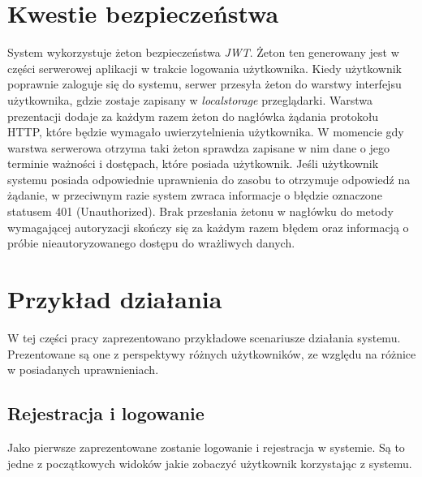 \documentclass[a4paper,twoside,12pt]{book}
\begin{document}
\section {Kwestie bezpieczeństwa}

System wykorzystuje żeton bezpieczeństwa \textit{JWT}. Żeton ten generowany jest w części serwerowej aplikacji w trakcie logowania użytkownika. Kiedy użytkownik poprawnie zaloguje się do systemu, serwer przesyła żeton do warstwy interfejsu użytkownika, gdzie zostaje zapisany w \textit{localstorage} przeglądarki. Warstwa prezentacji dodaje za każdym razem żeton do nagłówka żądania protokołu HTTP, które będzie wymagało uwierzytelnienia użytkownika. W momencie gdy warstwa serwerowa otrzyma taki żeton sprawdza zapisane w nim dane o jego terminie ważności i dostępach, które posiada użytkownik. Jeśli użytkownik systemu posiada odpowiednie uprawnienia do zasobu to otrzymuje odpowiedź na żądanie, w przeciwnym razie system zwraca informacje o błędzie oznaczone statusem 401 (Unauthorized). Brak przesłania żetonu w nagłówku do metody wymagającej autoryzacji skończy się za każdym razem błędem oraz informacją o próbie nieautoryzowanego dostępu do wrażliwych danych.

\section {Przykład działania}
W tej części pracy zaprezentowano przykładowe scenariusze działania systemu. Prezentowane są one z perspektywy różnych użytkowników, ze względu na różnice w posiadanych uprawnieniach.

\subsection{Rejestracja i logowanie}
Jako pierwsze zaprezentowane zostanie logowanie i rejestracja w systemie. Są to jedne z początkowych widoków jakie zobaczyć użytkownik korzystając z systemu.
\end{document}
